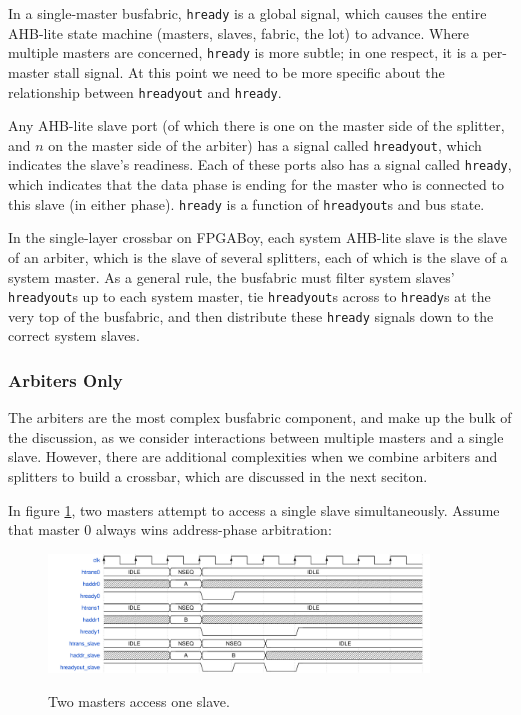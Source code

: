 \documentclass{article}
\begin{document}
In a single-master busfabric, \texttt{hready} is a global signal, which causes the entire AHB-lite state machine (masters, slaves, fabric, the lot) to advance. Where multiple masters are concerned, \texttt{hready} is more subtle; in one respect, it is a per-master stall signal. At this point we need to be more specific about the relationship between \texttt{hreadyout} and \texttt{hready}.

Any AHB-lite slave port (of which there is one on the master side of the splitter, and $n$ on the master side of the arbiter) has a signal called \texttt{hreadyout}, which indicates the slave's readiness. Each of these ports also has a signal called \texttt{hready}, which indicates that the data phase is ending for the master who is connected to this slave (in either phase). \texttt{hready} is a function of \texttt{hreadyout}s and bus state.

In the single-layer crossbar on FPGABoy, each system AHB-lite slave is the slave of an arbiter, which is the slave of several splitters, each of which is the slave of a system master. As a general rule, the busfabric must filter system slaves' \texttt{hreadyout}s up to each system master, tie \texttt{hreadyout}s across to \texttt{hready}s at the very top of the busfabric, and then distribute these \texttt{hready} signals down to the correct system slaves.

\subsubsection{Arbiters Only}

The arbiters are the most complex busfabric component, and make up the bulk of the discussion, as we consider interactions between multiple masters and a single slave. However, there are additional complexities when we combine arbiters and splitters to build a crossbar, which are discussed in the next seciton.

In figure \ref{diagram:ahbl_mm_simult1}, two masters attempt to access a single slave simultaneously. Assume that master 0 always wins address-phase arbitration:

\begin{figure}[H]
\centering
\caption{Two masters access one slave.}
\includegraphics[width=0.9\textwidth]{waves/ahbl_mm_simult1.pdf}
\label{diagram:ahbl_mm_simult1}
\end{figure}
\end{document}
